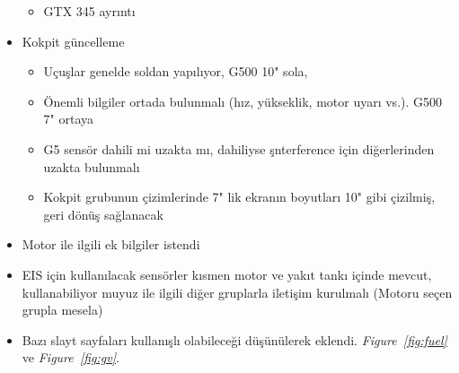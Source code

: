 \documentclass[a4paper,12pt]{article}
\begin{document}
\begin{itemize}
\begin{itemize}
			\item GTX 345 ayrıntı
		\end{itemize}
		
	\item Kokpit güncelleme
		\begin{itemize}
			\item Uçuşlar genelde soldan yapılıyor, G500 10" sola,
			\item Önemli bilgiler ortada bulunmalı (hız, yükseklik, motor uyarı vs.). G500 7" ortaya
			\item G5 sensör dahili mi uzakta mı, dahiliyse şnterference için diğerlerinden uzakta bulunmalı 
			\item Kokpit grubunun çizimlerinde 7" lik ekranın boyutları 10" gibi çizilmiş, geri dönüş sağlanacak 
		\end{itemize}
	
	 \item Motor ile ilgili ek bilgiler istendi
	 
	 \item EIS için kullanılacak sensörler kısmen motor ve yakıt tankı içinde mevcut, kullanabiliyor muyuz ile ilgili diğer gruplarla iletişim kurulmalı (Motoru seçen grupla mesela)
	 
	 \item Bazı slayt sayfaları kullanışlı olabileceği düşünülerek eklendi. \textit{Figure~\ref{fig:fuel}} ve \textit{Figure~\ref{fig:gv}}.
	 

\end{itemize}
\end{document}
